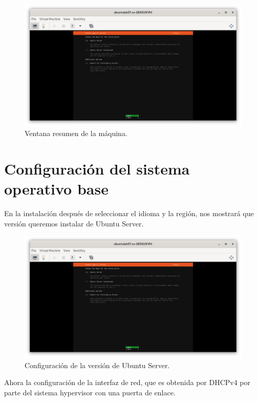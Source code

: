 \begin{figure}[H]
	\centering
	\includegraphics[scale=0.40]{05}
	\caption{Ventana resumen de la máquina.}
\end{figure}

\newpage
\section{Configuración del sistema operativo base}

En la instalación después de seleccionar el idioma y la región, nos mostrará que versión queremos instalar de Ubuntu Server.

\begin{figure}[H]
	\centering
	\includegraphics[scale=0.40]{05}
	\caption{Configuración de la versión de Ubuntu Server.}
\end{figure}

Ahora la configuración de la interfaz de red, que es obtenida por DHCPv4 por parte del sistema hypervisor con una puerta de enlace.


